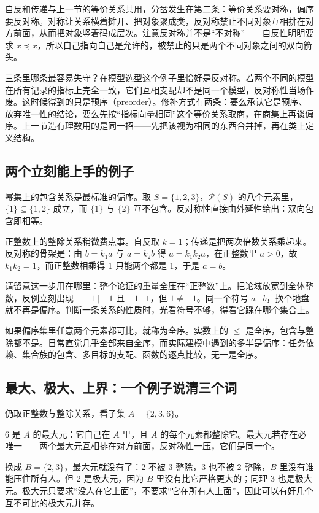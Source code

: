自反和传递与上一节的等价关系共用，分岔发生在第二条：等价关系要对称，偏序要反对称。对称让关系横着摊开、把对象聚成类，反对称禁止不同对象互相排在对方前面，从而把对象竖着码成层次。注意反对称并不是``不对称''——自反性明明要求 \(x\preceq x\)，所以自己指向自己是允许的，被禁止的只是两个不同对象之间的双向箭头。

三条里哪条最容易失守？在模型选型这个例子里恰好是反对称。若两个不同的模型在所有记录的指标上完全一致，它们互相支配却不是同一个模型，反对称性当场作废。这时候得到的只是预序（preorder）。修补方式有两条：要么承认它是预序、放弃唯一性的结论，要么先按``指标向量相同''这个等价关系取商，在商集上再谈偏序。上一节造有理数用的是同一招——先把该视为相同的东西合并掉，再在类上定义结构。

\subsection{两个立刻能上手的例子}

幂集上的包含关系是最标准的偏序。取 \(S=\{1,2,3\}\)，\(\mathcal P(S)\) 的八个元素里，\(\{1\}\subseteq\{1,2\}\) 成立，而 \(\{1\}\) 与 \(\{2\}\) 互不包含。反对称性直接由外延性给出：双向包含即相等。

正整数上的整除关系稍微费点事。自反取 \(k=1\)；传递是把两次倍数关系乘起来。反对称的骨架是：由 \(b=k_{1}a\) 与 \(a=k_{2}b\) 得 \(a=k_{1}k_{2}a\)，在正整数里 \(a>0\)，故 \(k_{1}k_{2}=1\)，而正整数相乘得 1 只能两个都是 1，于是 \(a=b\)。

请留意这一步用在哪里：整个论证的重量全压在``正整数''上。把论域放宽到全体整数，反例立刻出现——\(1\mid -1\) 且 \(-1\mid 1\)，但 \(1\neq -1\)。同一个符号 \(a\mid b\)，换个地盘就不再是偏序。判断一条关系的性质时，光看符号不够，得看它踩在哪个集合上。

如果偏序集里任意两个元素都可比，就称为全序。实数上的 \(\le\) 是全序，包含与整除都不是。日常直觉几乎全部来自全序，而实际建模中遇到的多半是偏序：任务依赖、集合族的包含、多目标的支配、函数的逐点比较，无一是全序。

\subsection{最大、极大、上界：一个例子说清三个词}

仍取正整数与整除关系，看子集 \(A=\{2,3,6\}\)。

6 是 \(A\) 的最大元：它自己在 \(A\) 里，且 \(A\) 的每个元素都整除它。最大元若存在必唯一——两个最大元互相排在对方前面，反对称性一压，它们是同一个。

换成 \(B=\{2,3\}\)，最大元就没有了：2 不被 3 整除，3 也不被 2 整除，\(B\) 里没有谁能压住所有人。但 2 是极大元，因为 \(B\) 里没有比它严格更大的；同理 3 也是极大元。极大元只要求``没人在它上面''，不要求``它在所有人上面''，因此可以有好几个互不可比的极大元并存。

